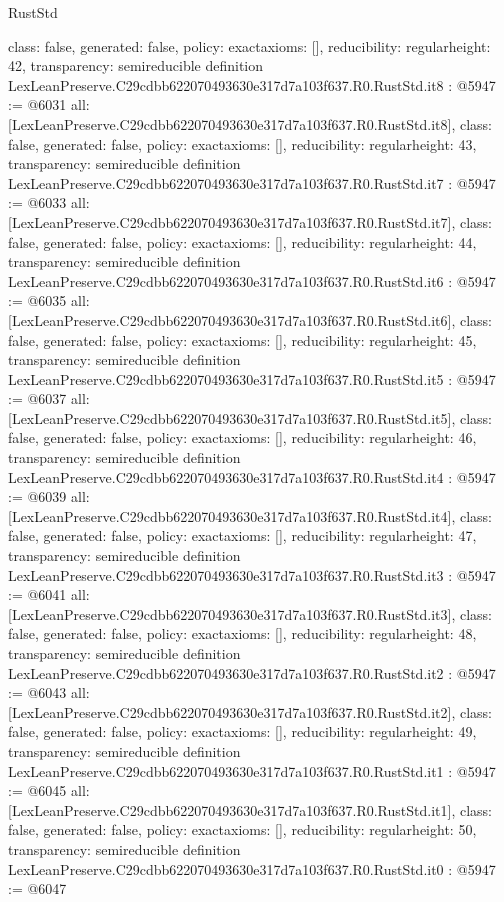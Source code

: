 \begin{lexlean}{RustStd}
\begin{coremodule}
{  class: false,
  generated: false,
  policy: exact{axioms: []},
  reducibility: regular{height: 42},
  transparency: semireducible
}
definition LexLeanPreserve.C29cdbb622070493630e317d7a103f637.R0.RustStd.it8 : @5947 := @6031 {
  all: [LexLeanPreserve.C29cdbb622070493630e317d7a103f637.R0.RustStd.it8],
  class: false,
  generated: false,
  policy: exact{axioms: []},
  reducibility: regular{height: 43},
  transparency: semireducible
}
definition LexLeanPreserve.C29cdbb622070493630e317d7a103f637.R0.RustStd.it7 : @5947 := @6033 {
  all: [LexLeanPreserve.C29cdbb622070493630e317d7a103f637.R0.RustStd.it7],
  class: false,
  generated: false,
  policy: exact{axioms: []},
  reducibility: regular{height: 44},
  transparency: semireducible
}
definition LexLeanPreserve.C29cdbb622070493630e317d7a103f637.R0.RustStd.it6 : @5947 := @6035 {
  all: [LexLeanPreserve.C29cdbb622070493630e317d7a103f637.R0.RustStd.it6],
  class: false,
  generated: false,
  policy: exact{axioms: []},
  reducibility: regular{height: 45},
  transparency: semireducible
}
definition LexLeanPreserve.C29cdbb622070493630e317d7a103f637.R0.RustStd.it5 : @5947 := @6037 {
  all: [LexLeanPreserve.C29cdbb622070493630e317d7a103f637.R0.RustStd.it5],
  class: false,
  generated: false,
  policy: exact{axioms: []},
  reducibility: regular{height: 46},
  transparency: semireducible
}
definition LexLeanPreserve.C29cdbb622070493630e317d7a103f637.R0.RustStd.it4 : @5947 := @6039 {
  all: [LexLeanPreserve.C29cdbb622070493630e317d7a103f637.R0.RustStd.it4],
  class: false,
  generated: false,
  policy: exact{axioms: []},
  reducibility: regular{height: 47},
  transparency: semireducible
}
definition LexLeanPreserve.C29cdbb622070493630e317d7a103f637.R0.RustStd.it3 : @5947 := @6041 {
  all: [LexLeanPreserve.C29cdbb622070493630e317d7a103f637.R0.RustStd.it3],
  class: false,
  generated: false,
  policy: exact{axioms: []},
  reducibility: regular{height: 48},
  transparency: semireducible
}
definition LexLeanPreserve.C29cdbb622070493630e317d7a103f637.R0.RustStd.it2 : @5947 := @6043 {
  all: [LexLeanPreserve.C29cdbb622070493630e317d7a103f637.R0.RustStd.it2],
  class: false,
  generated: false,
  policy: exact{axioms: []},
  reducibility: regular{height: 49},
  transparency: semireducible
}
definition LexLeanPreserve.C29cdbb622070493630e317d7a103f637.R0.RustStd.it1 : @5947 := @6045 {
  all: [LexLeanPreserve.C29cdbb622070493630e317d7a103f637.R0.RustStd.it1],
  class: false,
  generated: false,
  policy: exact{axioms: []},
  reducibility: regular{height: 50},
  transparency: semireducible
}
definition LexLeanPreserve.C29cdbb622070493630e317d7a103f637.R0.RustStd.it0 : @5947 := @6047 {
}
\end{coremodule}
\end{lexlean}
